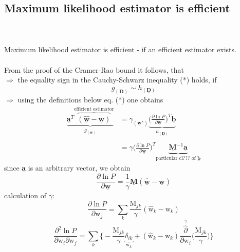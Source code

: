 \subsection{Maximum likelihood estimator is efficient}
\\\\
Maximum likelihood estimator is efficient - if an efficient estimator exists.\\\\
From the proof of the Cramer-Rao bound it follows, that\\
$\Rightarrow$ the equality sign in the Cauchy-Schwarz inequality (*) holds, if
\[ g_{(\underline{\mathbf{D}})} \sim h_{(\underline{\mathbf{D}})}
\]
$\Rightarrow$ using the definitions below eq. (*) one obtains
\begin{equation}
	\begin{array}{ll}
	\underbrace{\underline{\mathbf{a}}^T 
		\overbrace{(\hat{\underline{\mathbf{w}}} - 
			\underline{\mathbf{w}})}^{\text{efficient estimator}}}_{
				g_{(\underline{\mathbf{w}})}} 
	& = \gamma_{(\underline{\mathbf{w}}^*)} 
		\underbrace{
		\bigg( \frac{\partial \ln P}{\partial \underline{\mathbf{w}}}
		\bigg)^T \underline{\mathbf{b}} }_{
			h_{(\underline{\mathbf{D}})} }\\\\
	& = \gamma \Big( \frac{\partial \ln P}{\partial \underline{\mathbf{w}}}
		\Big)^T \underbrace{ \underline{\mathbf{M}}^{-1} 
			\underline{\mathbf{a}} }_{\text{particular cl??? of }
				\underline{\mathbf{b}}}
	\end{array}
\end{equation}
since $\underline{\mathbf{a}}$ is an arbitrary vector, we obtain
\begin{equation}
	\frac{\partial \ln P}{\partial \underline{\mathbf{w}}}
	= \frac{1}{\gamma} \underline{\mathbf{M}} (\hat{\underline{\mathbf{w}}}
		- \underline{\mathbf{w}})
\end{equation}
calculation of $\gamma$:
\begin{equation}
	\frac{\partial \ln P}{\partial \mathrm{w}_j} 
	= \sum_k \frac{\mathrm{M}_{jk}}{\gamma} 
		(\hat{\mathrm{w}}_k - \mathrm{w}_k)
\end{equation}
\begin{equation}
	\frac{\partial^2 \ln P}{\partial \mathrm{w}_i \partial \mathrm{w}_j}
	= \sum_k \bigg\{ -\frac{\mathrm{M}_{jk}}{\gamma} 
		\underbrace{ \delta_{ik} }_{\mathrm{w}_k}
		+ (\hat{\mathrm{w}}_k - \mathrm{w}_k)
		\frac{\overbrace{\partial}^{\gamma}}{\partial \mathrm{w}_i} 
		\bigg( \frac{\mathrm{M}_{jk}}{\gamma} \bigg)
		\bigg\}
\end{equation}
